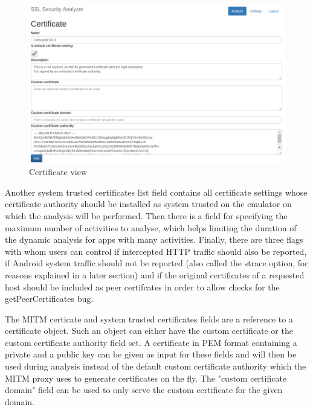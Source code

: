 \documentclass[draft,final]{vutinfth} %
\begin{document}
\begin{figure}
\caption{Certificate view}
\label{fig:cert}
\includegraphics[width=\textwidth,height=0.4\textheight]{certificate_new.png}
\end{figure}

Another system trusted certificates list field contains all certificate settings whose certificate authority should be installed as system trusted on the emulator on which the analysis will be performed. Then there is a field for specifying the maximum number of activities to analyse, which helps limiting the duration of the dynamic analysis for apps with many activities. Finally, there are three flags with whom users can control if intercepted HTTP traffic should also be reported, if Android system traffic should not be reported (also called the strace option, for reasons explained in a later section) and if the original certificates of a requested host should be included as peer certifcates in order to allow checks for the getPeerCertificates bug.

The MITM certicate and system trusted certificates fields are a reference to a certificate object. Such an object can either have the custom certificate or the custom certificate authority field set. A certificate in PEM format containing a private and a public key can be given as input for these fields and will then be used during analysis instead of the default custom certificate authority which the MITM proxy uses to generate certificates on the fly. The "custom certificate domain" field can be used to only serve the custom certificate for the given domain.
\end{document}
